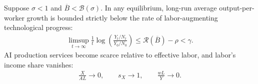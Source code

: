 \begin{proposition}
\label{prop:rewrite-low-cap-complements}
Suppose $\sigma<1$ and $\overline B<\mathcal B(\sigma)$.
In any equilibrium, long-run average output-per-worker growth is
bounded strictly below the rate of labor-augmenting technological progress:
\begin{gather*}
 \limsup_{t\to\infty}\frac1t
 \log\left(\frac{Y_t/N_t}{Y_0/N_0}\right)
 \leq\mathcal R(\overline B)-\rho<\gamma.
\end{gather*}
AI production services become scarce relative to effective labor, and
labor's income share vanishes:
\begin{gather*}
 \frac{X}{AL}\to0,\qquad s_X\to1,\qquad \frac{wL}{Y}\to0.
\end{gather*}
\end{proposition}

